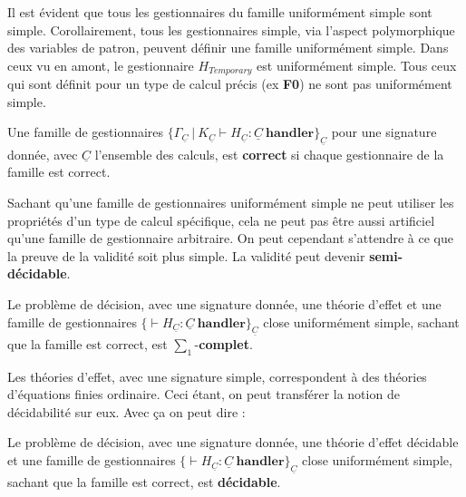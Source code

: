 Il est évident que tous les gestionnaires du famille uniformément simple sont simple. Corollairement, tous les gestionnaires simple, via l'aspect polymorphique des variables de patron, peuvent définir une famille uniformément simple. Dans ceux vu en amont, le gestionnaire $H_{Temporary}$ est uniformément simple. Tous ceux qui sont définit pour un type de calcul précis (ex \textbf{F0}) ne sont pas uniformément simple.

\begin{definition}
	Une famille de gestionnaires $\{\Gamma_{\underline{C}}~|~K_{\underline{C}} \vdash H_{\underline{C}}:\underline{C}~\textbf{handler}\}_{\underline{C}}$ pour une signature donnée, avec $\underline{C}$ l'ensemble des calculs, est \textbf{correct} si chaque gestionnaire de la famille est correct.
\end{definition}

Sachant qu'une famille de gestionnaires uniformément simple ne peut utiliser les propriétés d'un type de calcul spécifique, cela ne peut pas être aussi artificiel qu'une famille de gestionnaire arbitraire. On peut cependant s'attendre à ce que la preuve de la validité soit plus simple. La validité peut devenir \textbf{semi-décidable}.

\begin{theorem}
	Le problème de décision, avec une signature donnée, une théorie d'effet et une famille de gestionnaires $\{\vdash H_{\underline{C}}:\underline{C}~\textbf{handler}\}_{\underline{C}}$ close uniformément simple, sachant que la famille est correct, est $\sum_1$-\textbf{complet}.
\end{theorem}

Les théories d'effet, avec une signature simple, correspondent à des théories d'équations finies ordinaire. Ceci étant, on peut transférer la notion de décidabilité sur eux. Avec ça on peut dire :

\begin{theorem}
	Le problème de décision, avec une signature donnée, une théorie d'effet décidable et une famille de gestionnaires $\{\vdash H_{\underline{C}}:\underline{C}~\textbf{handler}\}_{\underline{C}}$ close uniformément simple, sachant que la famille est correct, est \textbf{décidable}.
\end{theorem}